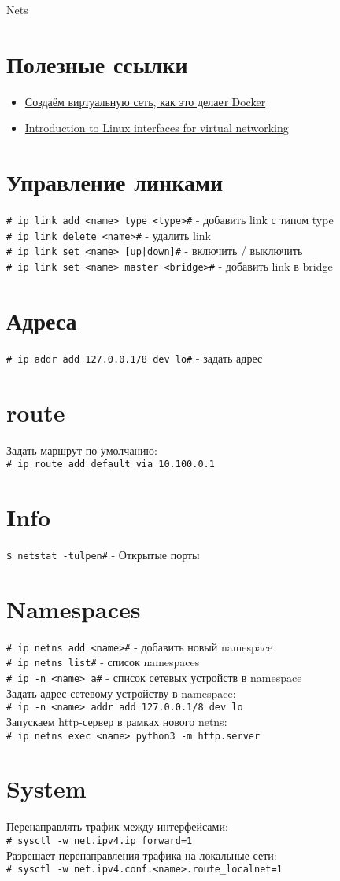 \documentclass[12pt, a4paper]{article}
\newcommand{\ccn}[2]{\noindent\texttt{#1\indent \#} - #2 \\}
\newcommand{\tc}[2]{\noindent #2 \\ \indent\texttt{#1} \\}
\begin{document}
	
	\begin{center} {\Huge Nets} \end{center}

	\section{Полезные ссылки}
	\begin{itemize}
		\item \href{https://habr.com/ru/articles/794262/}{Создаём виртуальную сеть, как это делает Docker}
		\item \href{https://developers.redhat.com/blog/2018/10/22/introduction-to-linux-interfaces-for-virtual-networking}{Introduction to Linux interfaces for virtual networking}
	\end{itemize}
	
	\section{Управление линками}
	\ccn{\# ip link add <name> type <type>}{добавить link с типом type}
	\ccn{\# ip link delete <name>}{удалить link}
	\ccn{\# ip link set <name> [up|down]}{включить / выключить}
	\ccn{\# ip link set <name> master <bridge>}{добавить link в bridge}

	\section{Адреса}
	\ccn{\# ip addr add 127.0.0.1/8 dev lo}{задать адрес}
	
	\section{route}
	\tc{\# ip route add default via 10.100.0.1}{Задать маршрут по умолчанию:}
	
	\section{Info}
	\ccn{\$ netstat -tulpen}{Открытые порты}
	
	\section{Namespaces}
	\ccn{\# ip netns add <name>}{добавить новый namespace}
	\ccn{\# ip netns list}{список namespaces}
	\ccn{\# ip -n <name> a}{список сетевых устройств в namespace}
	\tc{\# ip -n <name> addr add 127.0.0.1/8 dev lo}{Задать адрес сетевому устройству в namespace:}
	\tc{\# ip netns exec <name> python3 -m http.server}{Запускаем http-сервер в рамках нового netns:}
	
	\section{System}
	\tc{\# sysctl -w net.ipv4.ip\_forward=1}{Перенаправлять трафик между интерфейсами:}
	\tc{\# sysctl -w net.ipv4.conf.<name>.route\_localnet=1}{Разрешает перенаправления трафика на локальные сети:}
	
	
	
	

	
\end{document}

